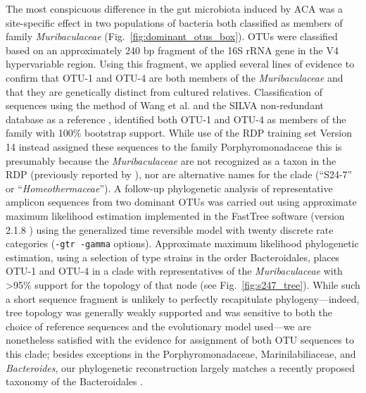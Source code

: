 \documentclass{doc/template/bmcart-nofigbox}
\newcommand{\frnlang}[1]{\textit{#1}}
\newcommand{\taxon}[1]{\frnlang{#1}}
\begin{document}
The most conspicuous difference in the gut microbiota induced by ACA was a
site-specific effect in two populations of bacteria both classified
as members of family \taxon{Muribaculaceae} (Fig.~\ref{fig:dominant_otus_box}).
OTUs were classified based on an approximately 240 bp fragment of the 16S rRNA
gene in the V4 hypervariable region.
Using this fragment, we applied several lines of evidence to confirm that OTU-1
and OTU-4 are both members of the \taxon{Muribaculaceae} and that they are
genetically distinct from cultured relatives.
Classification of sequences using the method of Wang et al. \cite{Wang2007} and the
SILVA non-redundant database as a reference \cite{Yilmaz2014}, identified both
OTU-1 and OTU-4 as members of the family with 100\% bootstrap support.
While use of the RDP training set \cite{Cole2014} Version 14 instead assigned
these sequences to the family Porphyromonadaceae
this is presumably because the \taxon{Muribaculaceae} are not recognized as a taxon
in the RDP (previously reported by \cite{Clavel2016}), nor are alternative names for
the clade (``S24-7'' or ``\taxon{Homeothermaceae}'').
A follow-up phylogenetic analysis of representative amplicon sequences from two
dominant OTUs was carried out using approximate maximum likelihood
estimation implemented in the FastTree software (version 2.1.8 \cite{Price2010}) using the
generalized time reversible model with twenty discrete rate categories
(\texttt{-gtr\ -gamma} options).
Approximate maximum likelihood phylogenetic estimation, using a selection of
type strains in the order Bacteroidales,
places OTU-1 and OTU-4 in a clade with representatives of the \taxon{Muribaculaceae}
with \textgreater{}95\% support for the topology of that node (see Fig.~\ref{fig:s247_tree}).
While such a short sequence fragment
is unlikely to perfectly recapitulate
phylogeny---indeed, tree topology was generally weakly supported
and was sensitive to both the choice of reference sequences
and the evolutionary model used---we are nonetheless satisfied with the
evidence for assignment of both OTU sequences to this clade;
besides exceptions in the Porphyromonadaceae, Marinilabiliaceae,
and \taxon{Bacteroides}, our phylogenetic reconstruction largely matches a recently
proposed taxonomy of the Bacteroidales \cite{Ormerod2016}.
\end{document}
